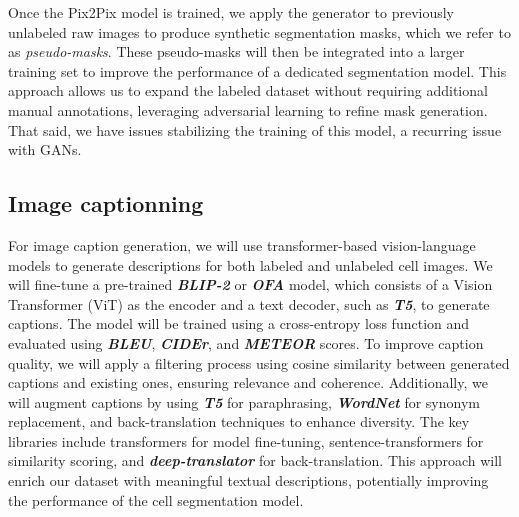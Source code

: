 \documentclass[]{article}
\begin{document}
Once the Pix2Pix model is trained, we apply the generator to previously unlabeled raw images to produce synthetic segmentation masks, which we refer to as \textit{pseudo-masks}. These pseudo-masks will then be integrated into a larger training set to improve the performance of a dedicated segmentation model. This approach allows us to expand the labeled dataset without requiring additional manual annotations, leveraging adversarial learning to refine mask generation. That said, we have issues stabilizing the training of this model, a recurring issue with GANs. 



\subsection{Image captionning}
For image caption generation, we will use transformer-based vision-language models to generate descriptions for both labeled and unlabeled cell images. We will fine-tune a pre-trained \textbf{\textit{BLIP-2}} or \textbf{\textit{OFA}} model, which consists of a Vision Transformer (ViT) as the encoder and a text decoder, such as \textbf{\textit{T5}}, to generate captions. The model will be trained using a cross-entropy loss function and evaluated using \textbf{\textit{BLEU}}, \textbf{\textit{CIDEr}}, and \textbf{\textit{METEOR}} scores. To improve caption quality, we will apply a filtering process using cosine similarity between generated captions and existing ones, ensuring relevance and coherence. Additionally, we will augment captions by using \textbf{\textit{T5}} for paraphrasing, \textbf{\textit{WordNet}} for synonym replacement, and back-translation techniques to enhance diversity. The key libraries include transformers for model fine-tuning, sentence-transformers for similarity scoring, and \textbf{\textit{deep-translator}} for back-translation. This approach will enrich our dataset with meaningful textual descriptions, potentially improving the performance of the cell segmentation model.
\end{document}

